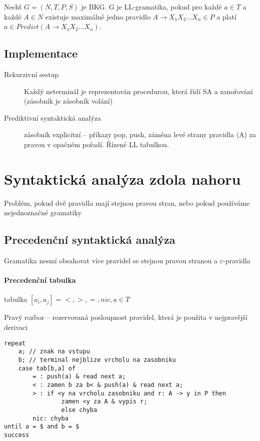 \documentclass[a4wide]{report}
\begin{document}
Nechť $G = (N, T, P, S)$ je BKG. G je LL-gramatika, pokud pro každé $a \in T$ a každé $A \in N$ existuje maximálně jedno pravidlo $A \to X_1 X_2 \dots X_n \in P$ a platí $a \in Predict(A \to X_1 X_2 \dots X_n)$.

\subsection{Implementace}
\begin{description}
	\item[Rekurzivní sestup] Každý neterminál je reprezentován procedurou, která řídí SA a zanořování (zásobník je zásobník volání)
	\item[Prediktivní syntaktická analýza] zásobník explicitní -- příkazy pop, push, záměna levé strany pravidla (A) za pravou v opačném pořadí. Řízené LL tabulkou.
\end{description}

\section{Syntaktická analýza zdola nahoru}

Problém, pokud dvě pravidla mají stejnou pravou stran, nebo pokud používáme nejednoznačné gramatiky

\subsection{Precedenční syntaktická analýza}

Gramatika nesmí obsahovat více pravidel se stejnou pravou stranou a $\varepsilon$-pravidla

\paragraph{Precedenční tabulka}
tabulka $[ a_i, a_j ] = {<, >, =, nic}, a \in T$

Pravý rozbor -- rezervovaná posloupnost pravidel, která je použita v nejpravější derivaci

\begin{lstlisting}
repeat
	a; // znak na vstupu
	b; // terminal nejblize vrcholu na zasobniku
	case tab[b,a] of
		= : push(a) & read next a;
		< : zamen b za b< & push(a) & read next a;
		> : if <y na vrcholu zasobniku and r: A -> y in P then
				zamen <y za A & vypis r;
				else chyba
		nic: chyba
until a = $ and b = $
success
\end{lstlisting}
\end{document}
